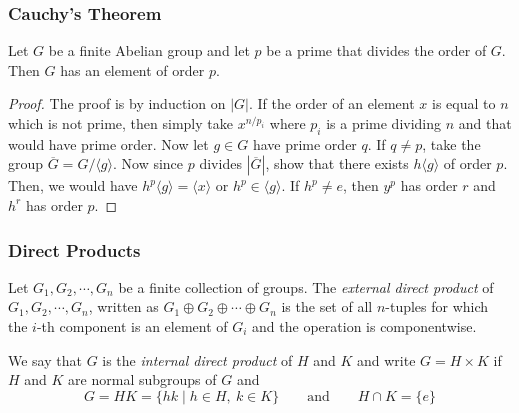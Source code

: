 \documentclass{beamer}
\begin{document}
	\begin{frame}
		\frametitle{Cauchy's Theorem}
		\begin{theorem}
			Let $G$ be a finite Abelian group and let $p$ be a prime that divides the order of $G$. Then $G$ has an element of order $p$.
		\end{theorem}
		\begin{proof}
			The proof is by induction on $|G|$. If the order of an element $x$ is equal to $n$ which is not prime, then simply take $x^{n/p_i}$ where $p_i$ is a prime dividing $n$ and that would have prime order. Now let $g\in G$ have prime order $q$. If $q\ne p$, take the group $\overline{G} = G/\langle g\rangle$. Now since $p$ divides $|\overline{G}|$, show that there exists $h\langle g\rangle$ of order $p$. Then, we would have $h^p\langle g\rangle = \langle x\rangle$ or $h^p\in\langle g\rangle$. If $h^p\ne e$, then $y^p$ has order $r$ and $h^r$ has order $p$.
		\end{proof}
	\end{frame}

	\begin{frame}
		\frametitle{Direct Products}
		\begin{definition}
			Let $G_1,G_2,\cdots,G_n$ be a finite collection of groups. The \textit{external direct product} of $G_1,G_2,\cdots,G_n$, written as $G_1\oplus G_2\oplus\cdots\oplus G_n$ is the set of all $n$-tuples for which the $i$-th component is an element of $G_i$ and the operation is componentwise.
		\end{definition}
		\begin{definition}
			We say that $G$ is the \textit{internal direct product} of $H$ and $K$ and write $G = H\times K$ if $H$ and $K$ are normal subgroups of $G$ and 
			\begin{equation*}
				G = HK = \{hk\mid h\in H,~k\in K\} \qquad\text{and}\qquad H\cap K = \{e\}
			\end{equation*} 
		\end{definition}
	\end{frame}
	
\end{document}
